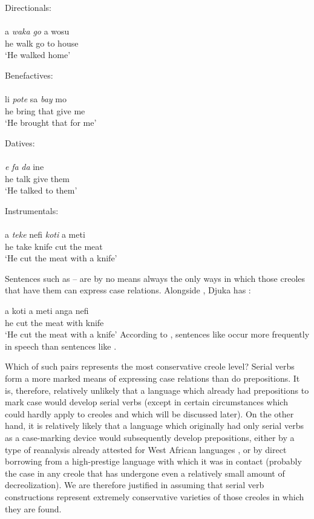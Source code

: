 \ea\label{ex:2:223}
Directionals:\\
\\
\gll a \emph{waka} \emph{go} a wosu\\
he walk go to house \\
\glt `He walked home'
\z

\ea\label{ex:2:224}
Benefactives:\\
\\
\gll li \emph{pote} sa \emph{bay} mo\\
he bring that give me\\
\glt `He brought that for me'
\z

\ea\label{ex:2:225}
Datives:\\
\\
\gll \emph{e} \emph{fa} \emph{da} ine \\
he talk give them \\
\glt `He talked to them'
\z

\ea\label{ex:2:226}
Instrumentals:\\
\\
\gll a \emph{teke} nefi \emph{koti} a meti \\
he take knife cut the meat\\
\glt `He cut the meat with a knife'
\z

Sentences such as -- are by no means always the only ways in which those creoles that have them can express case relations. Alongside , Djuka has :

\ea\label{ex:2:227}
\gll a koti a meti anga nefi\\
he cut the meat with knife\\
\glt `He cut the meat with a knife' 
\z
According to \citet{Huttar1975}, sentences like  occur more fre\-quently in speech than sentences like .

Which of such pairs represents the most conservative creole level? Serial verbs form a more marked means of expressing case rela\-tions than do prepositions. It is, therefore, relatively unlikely that a language which already had prepositions to mark case would develop serial verbs (except in certain circumstances which could hardly apply to creoles and which will be discussed later). On the other hand, it is relatively likely that a language which originally had only serial verbs as a case-marking device would subsequently develop prepositions, either by a type of reanalysis already attested for West African languages \citep{Lord1976}, or by direct borrowing from a high-prestige language with which it was in contact (probably the case in any creole that has undergone even a relatively small amount of decreolization). We are therefore justified in assuming that serial verb constructions represent extremely conservative varieties of those creoles in which they are found.

